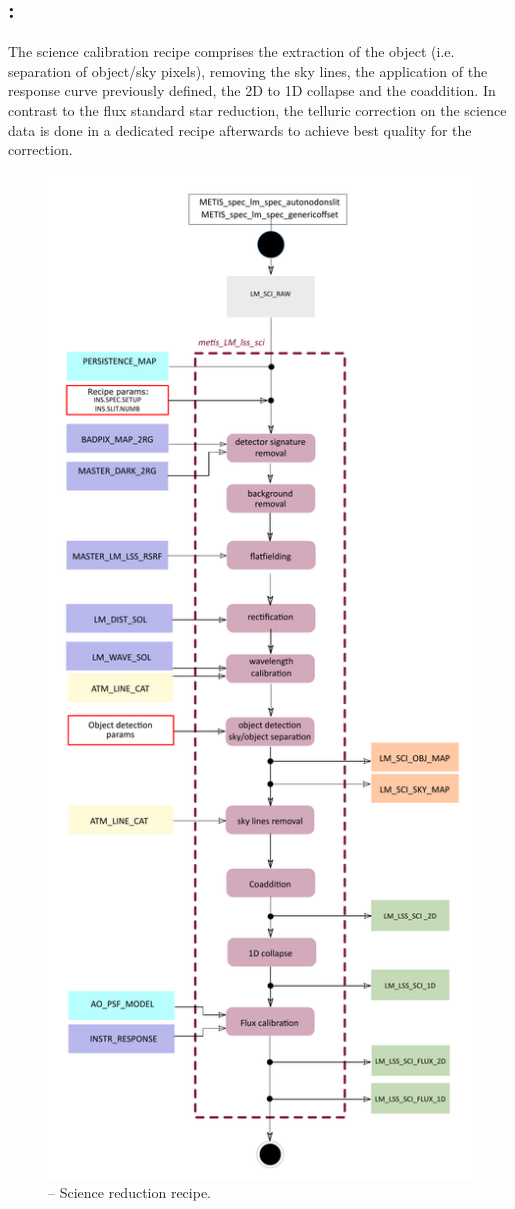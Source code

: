 \subsection{:}
The science calibration recipe comprises the extraction of the object (i.e. separation of object/sky pixels), removing the sky lines, the application of the response curve previously defined, the 2D to 1D collapse and the coaddition. In contrast to the flux standard star reduction, the telluric correction on the science data is done in a dedicated recipe afterwards to achieve best quality for the correction.
\begin{figure}[ht]
  \centering
  \includegraphics[width=0.4\textheight]{figures/metis_lm_lss_sci_v0.65.pdf}
  \caption[Recipe: ]{ --
    Science reduction recipe.}
  \label{Fig:rec_lm_lss_sci}
\end{figure}
\clearpage


